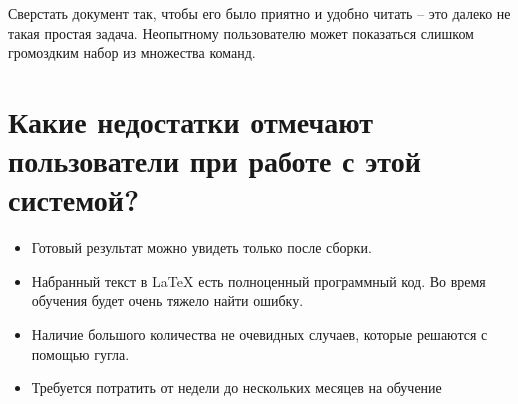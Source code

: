 \documentclass[a4paper,12pt]{article} %
\begin{document}
Сверстать документ так, чтобы его было приятно и удобно читать – это
далеко не такая простая задача. Неопытному пользователю может показаться слишком громоздким набор из множества команд.

\section{Какие недостатки отмечают пользователи при работе с этой системой?}

\begin{itemize}
\item Готовый результат можно увидеть только после сборки.

\item Набранный текст в LaTeX есть полноценный программный код. Во
время обучения будет очень тяжело найти ошибку.

\item Наличие большого количества не очевидных случаев, которые решаются с помощью гугла.

\item Требуется потратить от недели до нескольких месяцев на обучение
\end{itemize}
\end{document}
